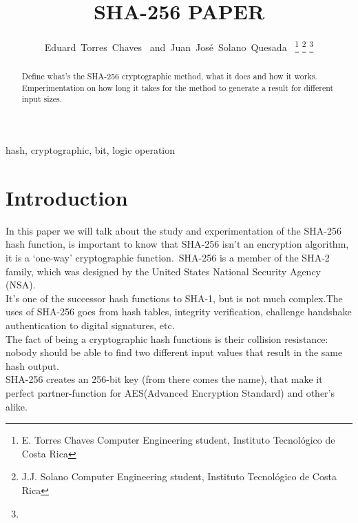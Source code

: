 \documentclass[journal]{IEEEtran}
\begin{document}
\title{SHA-256 PAPER}
\author{Eduard~Torres~Chaves~\IEEEmembership{}
        and~Juan~José~Solano~Quesada~\IEEEmembership{}
\thanks{E. Torres Chaves Computer Engineering student, Instituto Tecnológico de Costa Rica}%
\thanks{J.J. Solano Computer Engineering student, Instituto Tecnológico de Costa Rica}%
\thanks{}}
\maketitle
\begin{abstract}
Define what's the SHA-256 cryptographic method, what it does and how it works. Emperimentation on how long it takes for the method to generate a result for different input sizes.

\end{abstract}
\begin{IEEEkeywords}hash, cryptographic, bit, logic operation
\end{IEEEkeywords}
\IEEEpeerreviewmaketitle

\section{Introduction}
In this paper we will talk about the study and experimentation of the SHA-256 hash function, is important to know that SHA-256 isn't an encryption algorithm, it is a ‘one-way’ cryptographic function.\ SHA-256 is a member of the SHA-2 family, which was designed by the United States National Security Agency (NSA).\\ It's one of the successor hash functions to SHA-1, but is not much complex.The uses of SHA-256 goes from hash tables, integrity verification, challenge handshake authentication to digital signatures, etc.\\ 
The fact of being a cryptographic hash functions is their collision resistance: nobody should be able to find two different input values that result in the same hash output.\\
SHA-256 creates an 256-bit key (from there comes the name), that make it perfect partner-function for AES(Advanced Encryption Standard) and other's alike.
\end{document}

